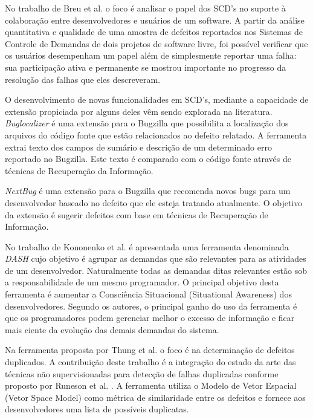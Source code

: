 \documentclass[msc,proposal,hidelot,hideabstract]{ppgccufmg} %
\begin{document}
No trabalho de Breu et al.\cite{Breu:2010:INB:1718918.1718973} o foco é
analisar o papel dos SCD's no suporte à colaboração entre desenvolvedores e
usuários de um software. A partir da análise quantitativa e qualidade de uma
amostra de defeitos reportados nos Sistemas de Controle de Demandas de dois
projetos de software livre, foi possível verificar que os usuários desempenham
um papel além de simplesmente reportar uma falha: sua participação ativa e
permanente se mostrou importante no progresso da resolução das falhas que eles
descreveram.

O desenvolvimento de novas funcionalidades em SCD's, mediante a capacidade de
extensão propiciada por alguns deles vêm sendo explorada na
literatura. \textit{Buglocalizer} \cite{Thung:2014:BIT:2635868.2661678} é uma
extensão para o Bugzilla que possibilita a localização dos arquivos do código fonte que estão relacionados ao defeito
relatado. A ferramenta extrai texto dos campos de sumário e descrição de um
determinado erro reportado no Bugzilla. Este texto é comparado com o código
fonte através de técnicas de Recuperação da Informação.

\textit{NextBug} \cite{101186} é uma extensão para o Bugzilla que
recomenda novos bugs para um desenvolvedor baseado no defeito que ele esteja
tratando atualmente. O objetivo da extensão é sugerir defeitos com base em técnicas de
Recuperação de Informação.

No trabalho de Kononenko et al. \cite{Kononenko:2014:DED:2591062.2591075} é
apresentada uma ferramenta denominada \textit{DASH} cujo objetivo é agrupar as
demandas que são relevantes para as atividades de um desenvolvedor. Naturalmente todas as demandas ditas relevantes estão sob a
responsabilidade de um mesmo programador. O principal objetivo desta
ferramenta é aumentar a Consciência Situacional (Situational Awareness) dos
desenvolvedores. Segundo os autores, o principal ganho do uso da ferramenta é
que os programadores podem gerenciar melhor o excesso de informação e ficar
mais ciente da evolução das demais demandas do sistema.

Na ferramenta proposta por Thung et al. \cite{Thung:2014:DIT:2642937.2648627} o
foco é na determinação de defeitos duplicados. A contribuição deste trabalho é a
integração do estado da arte das técnicas não supervisionadas para detecção de
falhas duplicadas conforme proposto por Runeson et al. \cite{Runeson:2007:DDD:1248820.1248882}. A ferramenta utiliza o Modelo de
Vetor Espacial (Vetor Space Model) como métrica de similaridade entre os defeitos e
fornece aos desenvolvedores uma lista de possíveis duplicatas.
\end{document}
